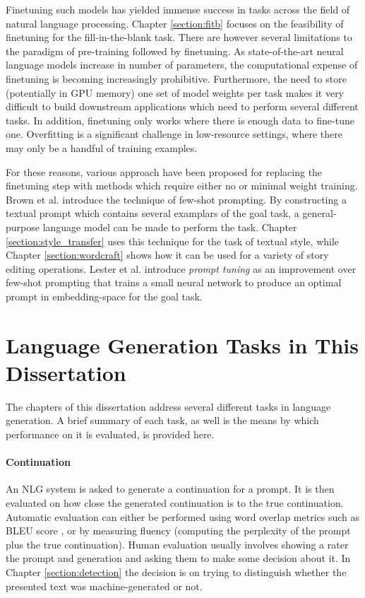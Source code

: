 \begin{itemize}
Finetuning such models has yielded immense success in tasks across the field of natural language processing.
Chapter \ref{section:fitb} focuses on the feasibility of finetuning for the fill-in-the-blank task.
There are however several limitations to the paradigm of pre-training followed by finetuning.
As state-of-the-art neural language models increase in number of parameters, the computational expense of finetuning is becoming increasingly prohibitive.
Furthermore, the need to store (potentially in GPU memory) one set of model weights per task makes it very difficult to build downstream applications which need to perform several different tasks.
In addition, finetuning only works where there is enough data to fine-tune one.
Overfitting is a significant challenge in low-resource settings, where there may only be a handful of training examples.

For these reasons, various approach have been proposed for replacing the finetuning step with methods which require either no or minimal weight training.
Brown et al. \citep{brown2020language} introduce the technique of few-shot prompting.
By constructing a textual prompt which contains several examplars of the goal task, a general-purpose language model can be made to perform the task.
Chapter \ref{section:style_transfer} uses this technique for the task of textual style, while Chapter \ref{section:wordcraft} shows how it can be used for a variety of story editing operations.
Lester et al. \citep{lester2021power} introduce \textit{prompt tuning} as an improvement over few-shot prompting that trains a small neural network to produce an optimal prompt in embedding-space for the goal task.

\section{Language Generation Tasks in This Dissertation}
The chapters of this dissertation address several different tasks in language generation.
A brief summary of each task, as well is the means by which performance on it is evaluated, is provided here.

\paragraph{Continuation}
An NLG system is asked to generate a continuation for a prompt. It is then evaluated on how close the generated continuation is to the true continuation. Automatic evaluation can either be performed using word overlap metrics such as BLEU score \citep{papineni2001bleu}, or by measuring fluency (computing the perplexity of the prompt plus the true continuation). Human evaluation usually involves showing a rater the prompt and generation and asking them to make some decision about it. In Chapter \ref{section:detection} the decision is on trying to distinguish whether the presented text was machine-generated or not.


\end{itemize}
